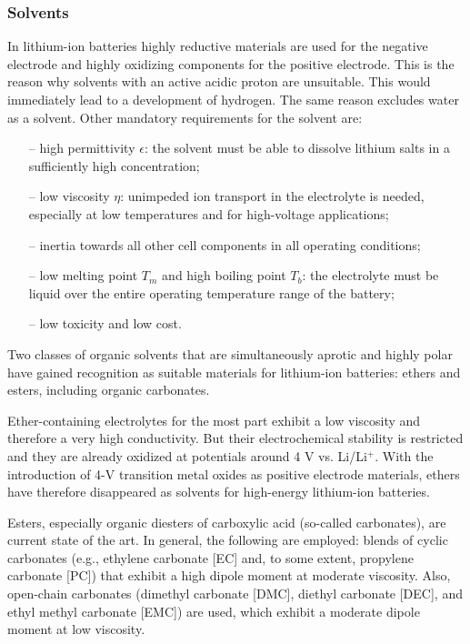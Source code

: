 \subsubsection{Solvents}
\label{sec:solvents}
In lithium-ion batteries highly reductive materials are used for the negative electrode and highly oxidizing components for the positive electrode. This is the reason why solvents with an active acidic proton are unsuitable. This would immediately lead to a development of hydrogen. The same reason excludes water as a solvent. Other mandatory requirements for the solvent are:
\begin{itemize}
    \item[--] high permittivity $\epsilon$: the solvent must be able to dissolve lithium salts in a sufficiently high concentration;
    \item[--] low viscosity $\eta$: unimpeded ion transport in the electrolyte is needed, especially at low temperatures and for high-voltage applications;
    \item[--] inertia towards all other cell components in all operating conditions;
    \item[--] low melting point $T_m$ and high boiling point $T_b$: the electrolyte must be liquid over the entire operating temperature range of the battery;
    \item[--] low toxicity and low cost.
\end{itemize}

Two classes of organic solvents that are simultaneously aprotic and highly polar have gained recognition as suitable materials for lithium-ion batteries: ethers and esters, including organic carbonates.

Ether-containing electrolytes for the most part exhibit a low viscosity and therefore a very high conductivity. But their electrochemical stability is restricted and they are already oxidized at potentials around 4 V vs. Li/Li$^+$. With the introduction of 4-V transition metal oxides as positive electrode materials, ethers have therefore disappeared as solvents for high-energy lithium-ion batteries.

Esters, especially organic diesters of carboxylic acid (so-called carbonates), are current state of the art. In general, the following are employed: blends of cyclic carbonates (e.g., ethylene carbonate [EC] and, to some extent, propylene carbonate [PC]) that exhibit a high dipole moment at moderate viscosity. Also, open-chain carbonates (dimethyl carbonate [DMC], diethyl carbonate [DEC], and ethyl methyl carbonate [EMC]) are used, which exhibit a moderate dipole moment at low viscosity.

